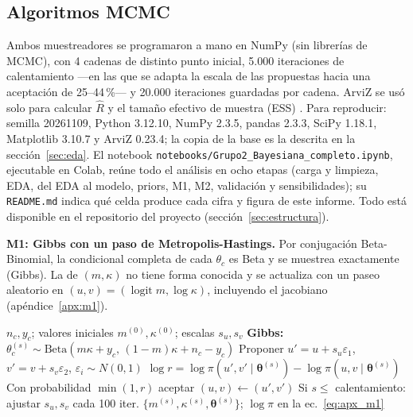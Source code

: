 \documentclass[10pt,twocolumn]{article}
\newcommand{\logit}{\operatorname{logit}}
\begin{document}
\subsection{Algoritmos MCMC}
Ambos muestreadores se programaron a mano en NumPy (sin librerías de MCMC), con 4 cadenas de distinto punto inicial, 5.000 iteraciones de calentamiento ---en las que se adapta la escala de las propuestas hacia una aceptación de 25--44\,\%--- y 20.000 iteraciones guardadas por cadena. ArviZ \citep{kumar2019arviz} se usó solo para calcular $\widehat R$ y el tamaño efectivo de muestra (ESS) \citep{vehtari2021rhat}. Para reproducir: semilla 20261109, Python 3.12.10, NumPy 2.3.5, pandas 2.3.3, SciPy 1.18.1, Matplotlib 3.10.7 y ArviZ 0.23.4; la copia de la base es la descrita en la sección~\ref{sec:eda}. El notebook \texttt{notebooks/Grupo2\_Bayesiana\_completo.ipynb}, ejecutable en Colab, reúne todo el análisis en ocho etapas (carga y limpieza, EDA, del EDA al modelo, priors, M1, M2, validación y sensibilidades); su \texttt{README.md} indica qué celda produce cada cifra y figura de este informe. Todo está disponible en el repositorio del proyecto (sección~\ref{sec:estructura}).

\textbf{M1: Gibbs con un paso de Metropolis-Hastings.} Por conjugación Beta-Binomial, la condicional completa de cada $\theta_c$ es Beta y se muestrea exactamente (Gibbs). La de $(m,\kappa)$ no tiene forma conocida y se actualiza con un paseo aleatorio en $(u,v)=(\logit m,\log\kappa)$, incluyendo el jacobiano (apéndice~\ref{apx:m1}).
\begin{algorithm}[t]
\caption{Gibbs + Metropolis-Hastings para M1}\label{alg:m1}
\small
\begin{algorithmic}[1]
\Require $n_c,y_c$; valores iniciales $m^{(0)},\kappa^{(0)}$; escalas $s_u,s_v$
\State \textbf{Gibbs:} $\theta_c^{(s)}\sim\mathrm{Beta}(m\kappa+y_c,\,(1-m)\kappa+n_c-y_c)$
\State Proponer $u'=u+s_u\varepsilon_1$, $v'=v+s_v\varepsilon_2$, $\varepsilon_i\sim N(0,1)$
\State $\log r=\log\pi(u',v'\mid\bm\theta^{(s)})-\log\pi(u,v\mid\bm\theta^{(s)})$
\State Con probabilidad $\min(1,r)$ aceptar $(u,v)\gets(u',v')$
\State Si $s\le$ calentamiento: ajustar $s_u,s_v$ cada 100 iter.
\EndFor
\Ensure $\{m^{(s)},\kappa^{(s)},\bm\theta^{(s)}\}$; $\log\pi$ en la ec.~\eqref{eq:apx_m1}
\end{algorithmic}
\end{algorithm}
\end{document}
